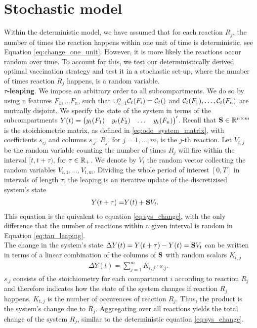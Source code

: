 \section{Stochastic model}
\label{sec:stochastic}
Within the deterministic model, we have assumed that for each reaction $R_j$, the number of times the reaction happens within one unit of time is deterministic, see Equation \eqref{eq:change_one_unit}. However, it is more likely the reactions occur random over time. To account for this, we test our deterministically derived optimal vaccination strategy and test it in a stochastic set-up, where the number of times reaction $R_j$ happens, is a random variable.  \\

\textbf{$\tau$-leaping}. We impose an arbitrary order to all subcompartments. We do so by using n features $F_1, \dots F_n$, such that $\cup_{i=1}^n \mathcal{C}_t(F_i) = \mathcal{C}_t()$ and $\mathcal{C}_t(F_1), \dots, \mathcal{C}_t(F_n)$ are mutually disjoint. We specify the state of the system in terms of the subcompartments $Y(t) = \begin{pmatrix} y_t(F_1) & y_t(F_2) & \dots & y_t(F_n)\end{pmatrix}'$. Recall that $\mathbf{S} \in \mathbb{R}^{n \times m}$ is the stoichiometric matrix, as defined in \eqref{eq:ode_system_matrix}, with coefficients $s_{ij}$ and columns $s_{.j}$. $R_j$, for $j=1, \dots, m$, is the $j$-th reaction. Let $V_{t,j}$ be the random variable counting the number of times $R_j$ will fire within the interval $[t, t + \tau)$, for $\tau \in \mathbb{R}_+$. We denote by $V_t$ the random vector collecting the random variables $V_{t,1}, \hdots, V_{t,m}$. Dividing the whole period of interest $[0, T]$ in intervals of length $\tau$, the leaping is an iterative update of the discretizised system's state
\begin{align}
\label{eq:tau_leaping}
Y(t + \tau) =& Y(t) + \mathbf{S} V_t.
\end{align}
This equation is the quivalent to equation \eqref{eq:sys_change}, with the only difference that the number of reactions within a given interval is random in Equation \eqref{eq:tau_leaping}. \\

The change in the system's state $\Delta Y(t) = Y(t + \tau) - Y(t)= \mathbf{S} V_t$ can be written in terms of a linear combination of the columns of $\mathbf{S}$ with random scalars $K_{t,j}$
\begin{align}
\Delta Y(t) = \sum_{j=1}^m K_{t,j} \cdot s_{.j}.
\end{align}
$s_{.j}$ consists of the stoichiometry for each compartment $i$ according to reaction $R_j$ and therefore indicates how the state of the system changes if reaction $R_j$ happens. $K_{t,j}$ is the number of occurences of reaction $R_j$. Thus, the product is the system's change due to $R_j$. Aggregating over all reactions yields the total change of the system $R_j$, similar to the deterministic equation \eqref{eq:sys_change}.\\  

